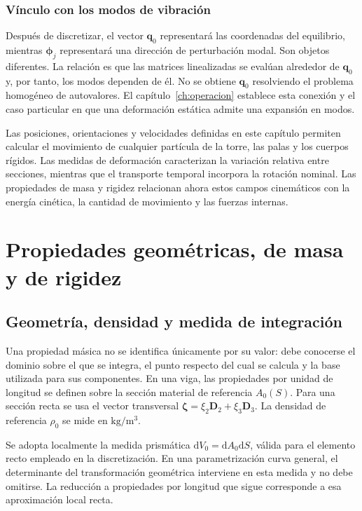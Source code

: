 \documentclass[11pt,a4paper,oneside]{report}
\newcommand{\vct}[1]{\bm{#1}}
\newcommand{\dd}{\mathrm d}
\begin{document}
\subsection{Vínculo con los modos de vibración}
Después de discretizar, el vector $\vct q_0$ representará las coordenadas del equilibrio, mientras $\vct\phi_j$ representará una dirección de perturbación modal. Son objetos diferentes. La relación es que las matrices linealizadas se evalúan alrededor de $\vct q_0$ y, por tanto, los modos dependen de él. No se obtiene $\vct q_0$ resolviendo el problema homogéneo de autovalores. El capítulo~\ref{ch:operacion} establece esta conexión y el caso particular en que una deformación estática admite una expansión en modos.

Las posiciones, orientaciones y velocidades definidas en este capítulo permiten calcular el movimiento de cualquier partícula de la torre, las palas y los cuerpos rígidos. Las medidas de deformación caracterizan la variación relativa entre secciones, mientras que el transporte temporal incorpora la rotación nominal. Las propiedades de masa y rigidez relacionan ahora estos campos cinemáticos con la energía cinética, la cantidad de movimiento y las fuerzas internas.
\chapter{Propiedades geométricas, de masa y de rigidez}
\label{ch:propiedades}
\section{Geometría, densidad y medida de integración}
Una propiedad másica no se identifica únicamente por su valor: debe conocerse el dominio sobre el que se integra, el punto respecto del cual se calcula y la base utilizada para sus componentes. En una viga, las propiedades por unidad de longitud se definen sobre la sección material de referencia $A_0(S)$. Para una sección recta se usa el vector transversal $\vct\zeta=\xi_2\vct D_2+\xi_3\vct D_3$. La densidad de referencia $\rho_0$ se mide en $\mathrm{kg/m^3}$.

Se adopta localmente la medida prismática $\dd V_0=\dd A_0\dd S$, válida para el elemento recto empleado en la discretización. En una parametrización curva general, el determinante del transformación geométrica interviene en esta medida y no debe omitirse. La reducción a propiedades por longitud que sigue corresponde a esa aproximación local recta.
\end{document}
